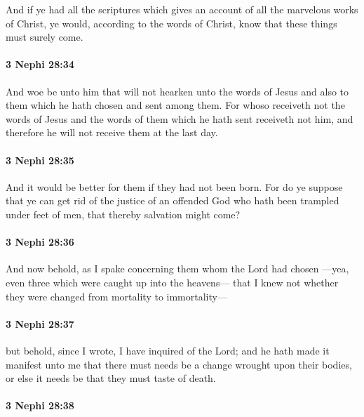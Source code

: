 			And if ye had all the scriptures
			which gives an account of all the marvelous works of Christ,
			ye would, according to the words of Christ,
			know that these things must surely come.

		\paragraph{3 Nephi 28:34} %
			\label{3NEPHI-28-34}

			And woe be unto him
			that will not hearken unto the words of Jesus
			and also to them which he hath chosen and sent among them.
			For whoso receiveth not the words of Jesus
			and the words of them which he hath sent
			receiveth not him,
			and therefore he will not receive them at the last day.

		\paragraph{3 Nephi 28:35} %
			\label{3NEPHI-28-35}

			And it would be better for them if they had not been born.
			For do ye suppose that ye can get rid of the justice of an offended God
			who hath been trampled under feet of men,
			that thereby salvation might come?

		\paragraph{3 Nephi 28:36} %
			\label{3NEPHI-28-36}

			And now behold, as I spake concerning them whom the Lord had chosen
			---yea, even three which were caught up into the heavens---
			that I knew not whether they were changed from mortality to immortality---

		\paragraph{3 Nephi 28:37} %
			\label{3NEPHI-28-37}

			but behold, since I wrote, I have inquired of the Lord;
			and he hath made it manifest unto me
			that there must needs be a change wrought upon their bodies,
			or else it needs be that they must taste of death.

		\paragraph{3 Nephi 28:38} %
			\label{3NEPHI-28-38}

